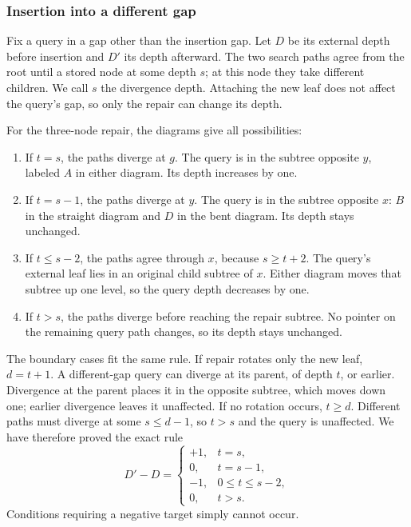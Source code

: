 \documentclass[11pt,a4paper]{article}
\theoremstyle{readable}
\begin{document}
\FloatBarrier
\subsubsection*{Insertion into a different gap}
Fix a query in a gap other than the insertion gap. Let $D$ be its
external depth before insertion and $D'$ its depth afterward. The two
search paths agree from the root until a stored node at some depth $s$;
at this node they take different children. We call $s$ the divergence
depth. Attaching the new leaf does not affect the query's gap, so only
the repair can change its depth.

For the three-node repair, the diagrams give all possibilities:
\begin{enumerate}
  \item If $t=s$, the paths diverge at $g$. The query is in the
        subtree opposite $y$, labeled $A$ in either diagram. Its
        depth increases by one.
  \item If $t=s-1$, the paths diverge at $y$. The query is in the
        subtree opposite $x$: $B$ in the straight diagram and $D$
        in the bent diagram. Its depth stays unchanged.
  \item If $t\le s-2$, the paths agree through $x$, because
        $s\ge t+2$. The query's external leaf lies in an original
        child subtree of $x$. Either diagram moves that subtree up
        one level, so the query depth decreases by one.
  \item If $t>s$, the paths diverge before reaching the repair
        subtree. No pointer on the remaining query path changes,
        so its depth stays unchanged.
\end{enumerate}

The boundary cases fit the same rule. If repair rotates only the new
leaf, $d=t+1$. A different-gap query can diverge at its parent, of
depth $t$, or earlier. Divergence at the parent places it in the
opposite subtree, which moves down one; earlier divergence leaves it
unaffected. If no rotation occurs, $t\ge d$. Different paths must
diverge at some $s\le d-1$, so $t>s$ and the query is unaffected.
We have therefore proved the exact rule
\begin{equation}
  D'-D=
  \begin{cases}
    +1,&t=s,\\
    0,&t=s-1,\\
    -1,&0\le t\le s-2,\\
    0,&t>s.
  \end{cases}
  \label{eq:depth-change}
\end{equation}
Conditions requiring a negative target simply cannot occur.
\end{document}
